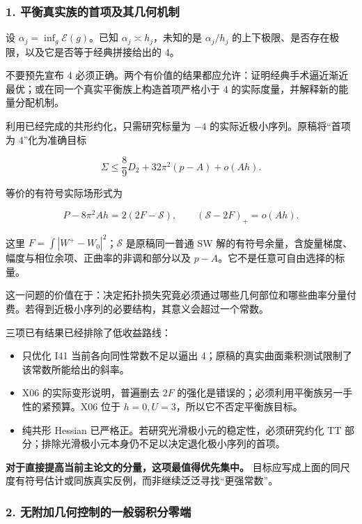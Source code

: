 \documentclass[
  10pt,
]{article}
\providecommand{\tightlist}{%
  \setlength{\itemsep}{0pt}\setlength{\parskip}{0pt}}
\begin{document}
\hypertarget{ux5e73ux8861ux771fux5b9eux65cfux7684ux9996ux9879ux53caux5176ux51e0ux4f55ux673aux5236}{%
\subsubsection{1.
平衡真实族的首项及其几何机制}\label{ux5e73ux8861ux771fux5b9eux65cfux7684ux9996ux9879ux53caux5176ux51e0ux4f55ux673aux5236}}

设 \(\alpha_j=\inf_g\mathcal E(g)\)。已知
\(\alpha_j\asymp h_j\)，未知的是 \(\alpha_j/h_j\)
的上下极限、是否存在极限，以及它是否等于经典拼接给出的 4。

不要预先宣布 4
必须正确。两个有价值的结果都应允许：证明经典手术逼近渐近最优；或在同一个真实平衡族上构造首项严格小于
4 的实际度量，并解释新的能量分配机制。

利用已经完成的共形约化，只需研究标量为 \(-4\)
的实际近极小序列。原稿将``首项为 4''化为准确目标

\[
\boxed{
\Sigma\le\frac89D_2+32\pi^2(p-A)+o(Ah).
}
\]

等价的有符号实际场形式为

\[
P-8\pi^2Ah=2(2F-\mathscr S),\qquad
\boxed{(\mathscr S-2F)_+=o(Ah).}
\]

这里 \(F=\int|W^+-W_0|^2\)；\(\mathscr S\) 是原稿同一普通 SW
解的有符号余量，含旋量梯度、幅度与相位余项、正曲率的非调和部分以及
\(p-A\)。它不是任意可自由选择的标量。

这一问题的价值在于：决定拓扑损失究竟必须通过哪些几何部位和哪些曲率分量付费。若得到近极小序列的必要结构，其意义会超过一个常数。

三项已有结果已经排除了低收益路线：

\begin{itemize}
\tightlist
\item
  只优化 I41 当前各向同性常数不足以逼出
  4；原稿的真实曲面乘积测试限制了该常数所能给出的斜率。
\item
  X06 的实际变形说明，普遍删去 \(2F\)
  的强化是错误的；必须利用平衡族另一手性的紧预算。X06 位于
  \(h=0,U=3\)，所以它不否定平衡族目标。
\item
  纯共形 Hessian 已严格正。若研究光滑极小元的稳定性，必须研究约化 TT
  部分；排除光滑极小元本身仍不足以决定退化极小序列的首项。
\end{itemize}

\textbf{对于直接提高当前主论文的分量，这项最值得优先集中。}
目标应写成上面的同尺度有符号估计或同族真实反例，而非继续泛泛寻找``更强常数''。

\hypertarget{ux65e0ux9644ux52a0ux51e0ux4f55ux63a7ux5236ux7684ux4e00ux822cux5f31ux79efux5206ux96f6ux7aef}{%
\subsubsection{2.
无附加几何控制的一般弱积分零端}\label{ux65e0ux9644ux52a0ux51e0ux4f55ux63a7ux5236ux7684ux4e00ux822cux5f31ux79efux5206ux96f6ux7aef}}
\end{document}
